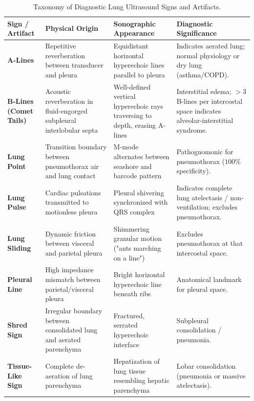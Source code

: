 \documentclass[11pt,a4paper]{article}
\begin{document}
\begin{table}[htbp]
\centering
\small
\setlength{\tabcolsep}{3.5pt}
\caption{Taxonomy of Diagnostic Lung Ultrasound Signs and Artifacts.}
\label{tab:lung_artifacts}
\begin{tabular}{p{2.8cm} p{3.2cm} p{4.2cm} p{4.2cm}}
\toprule
\textbf{Sign / Artifact} & \textbf{Physical Origin} & \textbf{Sonographic Appearance} & \textbf{Diagnostic Significance} \\
\midrule
\textbf{A-Lines} & Repetitive reverberation between transducer and pleura & Equidistant horizontal hyperechoic lines parallel to pleura & Indicates aerated lung; normal physiology or dry lung (asthma/COPD). \\
\addlinespace
\textbf{B-Lines (Comet Tails)} & Acoustic reverberation in fluid-engorged subpleural interlobular septa & Well-defined vertical hyperechoic rays traversing to depth, erasing A-lines & Interstitial edema; $> 3$ B-lines per intercostal space indicates alveolar-interstitial syndrome. \\
\addlinespace
\textbf{Lung Point} & Transition boundary between pneumothorax air and lung contact & M-mode alternates between seashore and barcode pattern & Pathognomonic for pneumothorax ($100\%$ specificity). \\
\addlinespace
\textbf{Lung Pulse} & Cardiac pulsations transmitted to motionless pleura & Pleural shivering synchronized with QRS complex & Indicates complete lung atelectasis / non-ventilation; excludes pneumothorax. \\
\addlinespace
\textbf{Lung Sliding} & Dynamic friction between visceral and parietal pleura & Shimmering granular motion ("ants marching on a line") & Excludes pneumothorax at that intercostal space. \\
\addlinespace
\textbf{Pleural Line} & High impedance mismatch between parietal/visceral pleura & Bright horizontal hyperechoic line beneath ribs & Anatomical landmark for pleural space. \\
\addlinespace
\textbf{Shred Sign} & Irregular boundary between consolidated lung and aerated parenchyma & Fractured, serrated hyperechoic interface & Subpleural consolidation / pneumonia. \\
\addlinespace
\textbf{Tissue-Like Sign} & Complete de-aeration of lung parenchyma & Hepatization of lung tissue resembling hepatic parenchyma & Lobar consolidation (pneumonia or massive atelectasis). \\
\bottomrule
\end{tabular}
\end{table}
\end{document}
